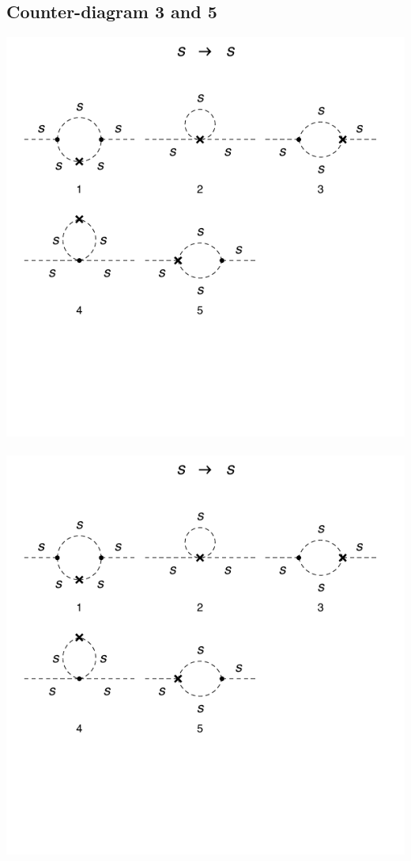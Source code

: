 \documentclass[11pt]{article}
\begin{document}
   \subsection*{Counter-diagram 3 and 5}
 \noindent\begin{minipage}{0.3\textwidth}
 \begin{center}
\includegraphics{2loop_3c.pdf} \ \ \ \ \ \ \ \includegraphics{2loop_5c.pdf}
\end{center}
\end{minipage}
\end{document}
